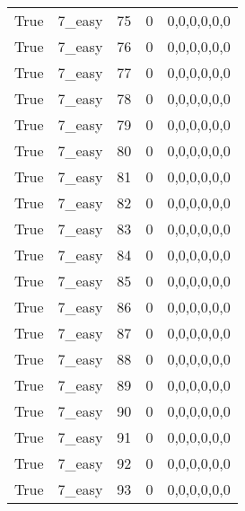 \begin{tabular}{llrrl}
 True            & 7\_easy              &            75 &                     0 & 0,0,0,0,0,0   \\
 True            & 7\_easy              &            76 &                     0 & 0,0,0,0,0,0   \\
 True            & 7\_easy              &            77 &                     0 & 0,0,0,0,0,0   \\
 True            & 7\_easy              &            78 &                     0 & 0,0,0,0,0,0   \\
 True            & 7\_easy              &            79 &                     0 & 0,0,0,0,0,0   \\
 True            & 7\_easy              &            80 &                     0 & 0,0,0,0,0,0   \\
 True            & 7\_easy              &            81 &                     0 & 0,0,0,0,0,0   \\
 True            & 7\_easy              &            82 &                     0 & 0,0,0,0,0,0   \\
 True            & 7\_easy              &            83 &                     0 & 0,0,0,0,0,0   \\
 True            & 7\_easy              &            84 &                     0 & 0,0,0,0,0,0   \\
 True            & 7\_easy              &            85 &                     0 & 0,0,0,0,0,0   \\
 True            & 7\_easy              &            86 &                     0 & 0,0,0,0,0,0   \\
 True            & 7\_easy              &            87 &                     0 & 0,0,0,0,0,0   \\
 True            & 7\_easy              &            88 &                     0 & 0,0,0,0,0,0   \\
 True            & 7\_easy              &            89 &                     0 & 0,0,0,0,0,0   \\
 True            & 7\_easy              &            90 &                     0 & 0,0,0,0,0,0   \\
 True            & 7\_easy              &            91 &                     0 & 0,0,0,0,0,0   \\
 True            & 7\_easy              &            92 &                     0 & 0,0,0,0,0,0   \\
 True            & 7\_easy              &            93 &                     0 & 0,0,0,0,0,0   \\

\end{tabular}
